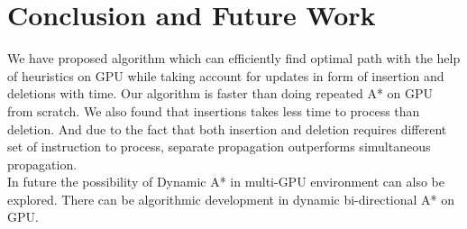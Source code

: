 \documentclass[a4paper]{article}
\begin{document}
\section{Conclusion and Future Work}
We have proposed algorithm which can efficiently find optimal path with the help of heuristics on GPU while taking account for updates in form of insertion and deletions with time. Our algorithm is faster than doing repeated A* on GPU from scratch. We also found that insertions takes less time to process than deletion. And due to the fact that both insertion and deletion requires different set of instruction to process, separate propagation outperforms simultaneous propagation.\\
In future the possibility of Dynamic A* in multi-GPU environment can also be explored. There can be algorithmic development in dynamic bi-directional A* on GPU.
\end{document}
